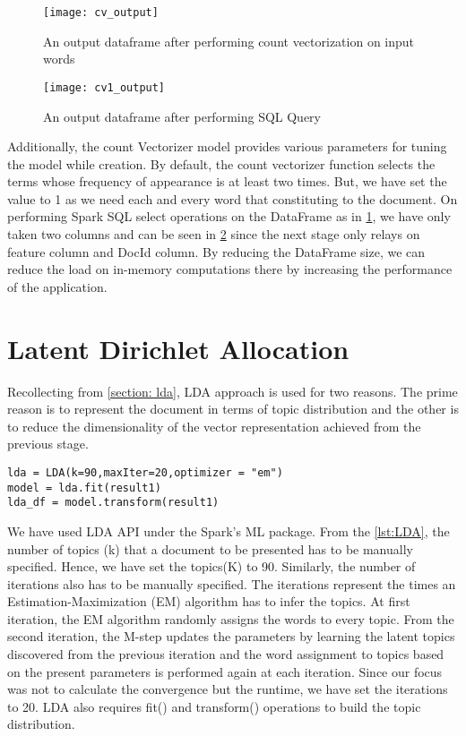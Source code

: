 \begin{figure}[htbp]
	\centering
		\texttt{[image: cv\_output]}
	\caption{An output dataframe after performing count vectorization on input words }
	\label{fig: cv_output}
\end{figure}


\begin{figure}[htbp]
	\centering
		\texttt{[image: cv1\_output]}
	\caption{An output dataframe after performing SQL Query }
	\label{fig: cv1_output}
\end{figure}

\par Additionally, the count Vectorizer model provides various parameters for tuning the model while creation. By default, the count vectorizer function selects the terms whose frequency of appearance is at least two times. But, we have set the value to 1 as we need each and every word that constituting to the document. On performing Spark SQL select operations on the DataFrame as in \ref{fig: cv_output}, we have only taken two columns and can be seen in \ref{fig: cv1_output} since the next stage only relays on feature column and DocId column. By reducing the DataFrame size, we can reduce the load on in-memory computations there by increasing the performance of the application.  


\section{Latent Dirichlet Allocation}
Recollecting from \ref{section: lda}, LDA approach is used for two reasons. The prime reason is to represent the document in terms of topic distribution and the other is to reduce the dimensionality of the vector representation achieved from the previous stage.

\begin{lstlisting}[style=Java,float=htb,caption={Python code to perform LDA Topic Modeling },label={lst:LDA}]
lda = LDA(k=90,maxIter=20,optimizer = "em")       
model = lda.fit(result1)
lda_df = model.transform(result1)
\end{lstlisting}


\par We have used LDA API under the Spark's ML package. From the \ref{lst:LDA}, the number of topics (k) that a document to be presented has to be manually specified. Hence, we have set the topics(K) to 90. Similarly, the number of iterations also has to be manually specified. The iterations represent the times an Estimation-Maximization (EM) algorithm has to infer the topics. At first iteration, the EM algorithm randomly assigns the words to every topic. From the second iteration, the M-step updates the parameters by learning the latent topics discovered from the previous iteration and the word assignment to topics based on the present parameters is performed again at each iteration. Since our focus was not to calculate the convergence but the runtime, we have set the iterations to 20. LDA also requires fit() and transform() operations to build the topic distribution. 

